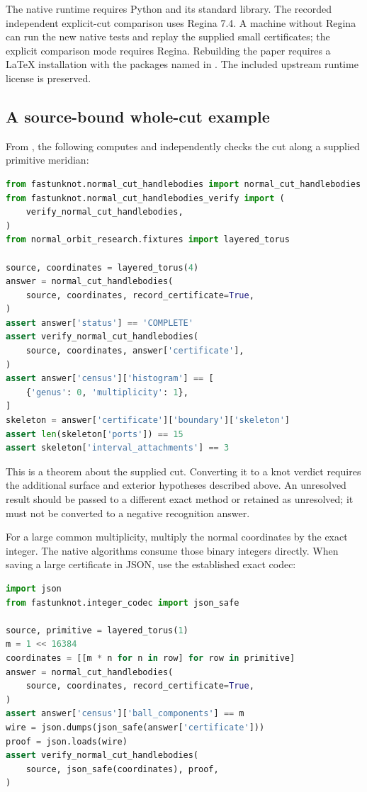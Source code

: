 The native runtime requires Python and its standard library.  The recorded
independent explicit-cut comparison uses Regina 7.4.  A machine without Regina
can run the new native tests and replay the supplied small certificates;
the explicit comparison mode requires Regina.  Rebuilding the paper requires
a LaTeX installation with the packages named in .  The
included upstream runtime license is preserved.

\subsection{A source-bound whole-cut example}

From , the following computes and independently checks
the cut along a supplied primitive meridian:

\begin{lstlisting}[language=Python]
from fastunknot.normal_cut_handlebodies import normal_cut_handlebodies
from fastunknot.normal_cut_handlebodies_verify import (
    verify_normal_cut_handlebodies,
)
from normal_orbit_research.fixtures import layered_torus

source, coordinates = layered_torus(4)
answer = normal_cut_handlebodies(
    source, coordinates, record_certificate=True,
)
assert answer['status'] == 'COMPLETE'
assert verify_normal_cut_handlebodies(
    source, coordinates, answer['certificate'],
)
assert answer['census']['histogram'] == [
    {'genus': 0, 'multiplicity': 1},
]
skeleton = answer['certificate']['boundary']['skeleton']
assert len(skeleton['ports']) == 15
assert skeleton['interval_attachments'] == 3
\end{lstlisting}

This is a theorem about the supplied cut.  Converting it to a knot verdict
requires the additional surface and exterior hypotheses described above.
An unresolved result should be passed to a different exact method or retained
as unresolved; it must not be converted to a negative recognition answer.

For a large common multiplicity, multiply the normal coordinates by the exact
integer.  The native algorithms consume those binary integers directly.
When saving a large certificate in JSON, use the established exact codec:

\begin{lstlisting}[language=Python]
import json
from fastunknot.integer_codec import json_safe

source, primitive = layered_torus(1)
m = 1 << 16384
coordinates = [[m * n for n in row] for row in primitive]
answer = normal_cut_handlebodies(
    source, coordinates, record_certificate=True,
)
assert answer['census']['ball_components'] == m
wire = json.dumps(json_safe(answer['certificate']))
proof = json.loads(wire)
assert verify_normal_cut_handlebodies(
    source, json_safe(coordinates), proof,
)
\end{lstlisting}

